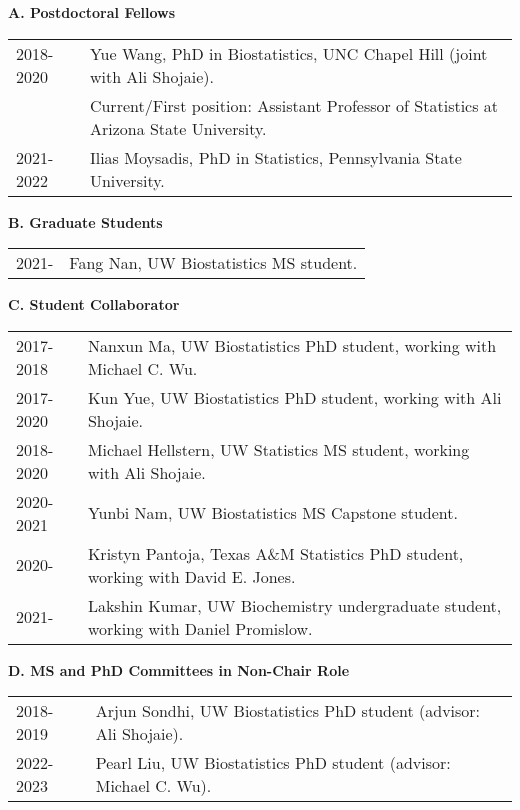 \documentclass[10pt]{article}
\begin{document}
\textbf{A. Postdoctoral Fellows}
\begin{table}[H]
\hskip0.9cm\begin{tabular}{p{1.6cm}p{12cm}}
2018-2020 & Yue Wang, PhD in Biostatistics, UNC Chapel Hill (joint with Ali Shojaie).\\
& Current/First position: Assistant Professor of Statistics at Arizona State University.\\
2021-2022  & Ilias Moysadis, PhD in Statistics, Pennsylvania State University. 
\end{tabular}
\end{table}

\textbf{B. Graduate Students}

\begin{table}[H]
\hskip0.9cm\begin{tabular}{p{1.6cm}p{12cm}}
2021- & Fang Nan, UW Biostatistics MS student.
\end{tabular}
\end{table}

\textbf{C. Student Collaborator}
\begin{table}[H]
\hskip0.9cm\begin{tabular}{p{1.6cm}p{12cm}}
2017-2018 & Nanxun Ma, UW Biostatistics PhD student, working with Michael C. Wu.\\
2017-2020 & Kun Yue, UW Biostatistics PhD student, working with Ali Shojaie.\\
2018-2020 & Michael Hellstern, UW Statistics MS student, working with Ali Shojaie. \\
2020-2021 & Yunbi Nam, UW Biostatistics MS Capstone student. \\
2020- & Kristyn Pantoja, Texas A\&M Statistics PhD student, working with David E. Jones. \\
2021- & Lakshin Kumar, UW Biochemistry undergraduate student, working with Daniel Promislow.
\end{tabular}
\end{table}

\textbf{D. MS and PhD Committees in Non-Chair Role}
\begin{table}[H]
\hskip0.9cm\begin{tabular}{p{1.6cm}p{12cm}}
2018-2019 & Arjun Sondhi, UW Biostatistics PhD student (advisor: Ali Shojaie). \\
2022-2023 & Pearl Liu, UW Biostatistics PhD student (advisor: Michael C. Wu). 
\end{tabular}
\end{table}
\end{document}

